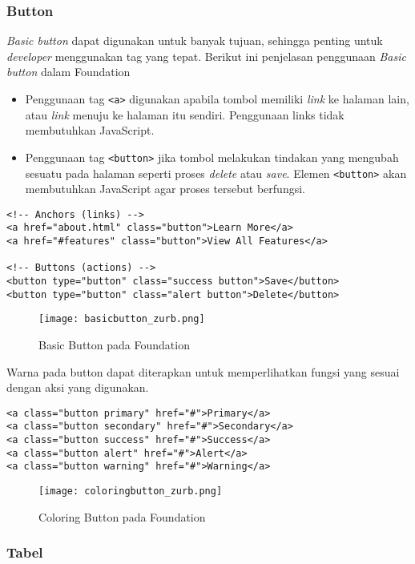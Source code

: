 {\subsubsection{Button}
\textit{Basic button} dapat digunakan untuk banyak tujuan, sehingga penting untuk \textit{developer} menggunakan tag yang tepat. Berikut ini penjelasan penggunaan \textit{Basic button} dalam Foundation
\begin{itemize}
  \item Penggunaan tag \texttt{<a>} digunakan apabila tombol memiliki \textit{link} ke halaman lain, atau \textit{link} menuju ke halaman itu sendiri. Penggunaan links tidak membutuhkan JavaScript.
  \item Penggunaan tag \texttt{<button>} jika tombol melakukan tindakan yang mengubah sesuatu pada halaman seperti proses \textit{delete} atau \textit{save}. Elemen \texttt{<button>} akan membutuhkan JavaScript agar proses tersebut berfungsi. 
\end{itemize}

\begin{lstlisting}[frame=single] 
<!-- Anchors (links) -->
<a href="about.html" class="button">Learn More</a>
<a href="#features" class="button">View All Features</a>

<!-- Buttons (actions) -->
<button type="button" class="success button">Save</button>
<button type="button" class="alert button">Delete</button>
\end{lstlisting}

\begin{figure} [H]
	\centering  
	\texttt{[image: basicbutton\_zurb.png]}  
	\caption{Basic Button pada Foundation}
\end{figure}

\noindent Warna pada button dapat diterapkan untuk memperlihatkan fungsi yang sesuai dengan aksi yang digunakan.
\begin{lstlisting}[frame=single] 
<a class="button primary" href="#">Primary</a>
<a class="button secondary" href="#">Secondary</a>
<a class="button success" href="#">Success</a>
<a class="button alert" href="#">Alert</a>
<a class="button warning" href="#">Warning</a>
\end{lstlisting}

\begin{figure} [H]
	\centering  
	\texttt{[image: coloringbutton\_zurb.png]}  
	\caption{Coloring Button pada Foundation}
\end{figure}

\subsubsection{Tabel}

}
